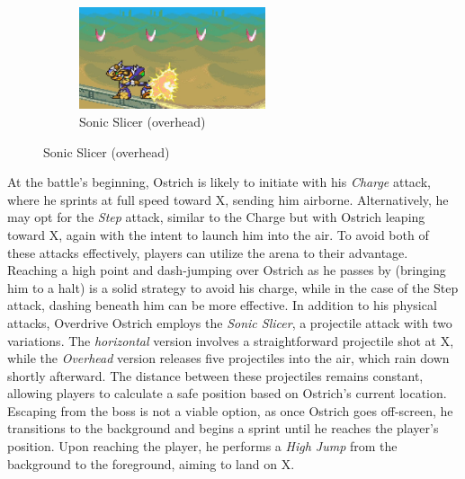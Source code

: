 \begin{figure}[htp]
\begin{subfigure}{\linewidth}
		\includegraphics[height=3cm]{figures/X2/Overdrive_ostrich/Ostrich_charged_SS_2.png}
		\caption{Sonic Slicer (overhead)}
	\end{subfigure}
\end{figure}

At the battle's beginning, Ostrich is likely to initiate with his \emph{Charge} attack, where he sprints at full speed toward X, sending him airborne. Alternatively, he may opt for the \emph{Step} attack, similar to the Charge but with Ostrich leaping toward X, again with the intent to launch him into the air. To avoid both of these attacks effectively, players can utilize the arena to their advantage. Reaching a high point and dash-jumping over Ostrich as he passes by (bringing him to a halt) is a solid strategy to avoid his charge, while in the case of the Step attack, dashing beneath him can be more effective.
In addition to his physical attacks, Overdrive Ostrich employs the \emph{Sonic Slicer}, a projectile attack with two variations. The \emph{horizontal} version involves a straightforward projectile shot at X, while the \emph{Overhead} version releases five projectiles into the air, which rain down shortly afterward. The distance between these projectiles remains constant, allowing players to calculate a safe position based on Ostrich's current location. Escaping from the boss is not a viable option, as once Ostrich goes off-screen, he transitions to the background and begins a sprint until he reaches the player's position. Upon reaching the player, he performs a \emph{High Jump} from the background to the foreground, aiming to land on X.

